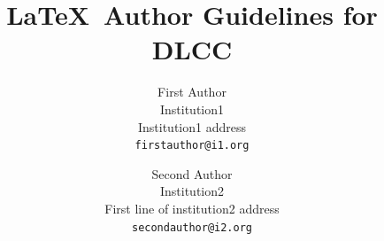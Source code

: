 \documentclass[10pt,twocolumn,letterpaper]{article}
\begin{document}
\title{\LaTeX\ Author Guidelines for DLCC}

\author{First Author\\
Institution1\\
Institution1 address\\
{\tt\small firstauthor@i1.org}
\and
Second Author\\
Institution2\\
First line of institution2 address\\
{\tt\small secondauthor@i2.org}
}

\maketitle







{\small


}
\end{document}
